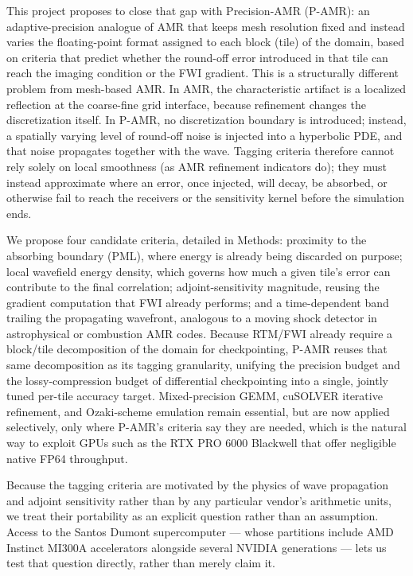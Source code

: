 \documentclass[12pt,a4paper]{article}
\newcommand{\pamr}{P\nobreakdash-AMR}
\begin{document}
This project proposes to close that gap with Precision-AMR (\pamr{}): an
adaptive-precision analogue of AMR that keeps mesh resolution fixed and instead
varies the floating-point format assigned to each block (tile) of the domain,
based on criteria that predict whether the round-off error introduced in that
tile can reach the imaging condition or the FWI gradient. This is a structurally
different problem from mesh-based AMR. In AMR, the characteristic artifact is a
localized reflection at the coarse-fine grid interface, because refinement
changes the discretization itself. In \pamr{}, no discretization boundary is
introduced; instead, a spatially varying level of round-off noise is injected
into a hyperbolic PDE, and that noise propagates together with the wave. Tagging
criteria therefore cannot rely solely on local smoothness (as AMR refinement
indicators do); they must instead approximate where an error, once injected, will
decay, be absorbed, or otherwise fail to reach the receivers or the sensitivity
kernel before the simulation ends.

We propose four candidate criteria, detailed in Methods: proximity to the
absorbing boundary (PML), where energy is already being discarded on purpose;
local wavefield energy density, which governs how much a given tile's error can
contribute to the final correlation; adjoint-sensitivity magnitude, reusing the
gradient computation that FWI already performs; and a time-dependent band
trailing the propagating wavefront, analogous to a moving shock detector in
astrophysical or combustion AMR codes. Because RTM/FWI already require a
block/tile decomposition of the domain for checkpointing, \pamr{} reuses that
same decomposition as its tagging granularity, unifying the precision budget and
the lossy-compression budget of differential checkpointing into a single, jointly
tuned per-tile accuracy target. Mixed-precision GEMM, cuSOLVER iterative
refinement, and Ozaki-scheme emulation remain essential, but are now applied
selectively, only where \pamr{}'s criteria say they are needed, which is the
natural way to exploit GPUs such as the RTX PRO 6000 Blackwell that offer
negligible native FP64 throughput.

Because the tagging criteria are motivated by the physics of wave propagation and
adjoint sensitivity rather than by any particular vendor's arithmetic units, we
treat their portability as an explicit question rather than an assumption. Access
to the Santos Dumont supercomputer --- whose partitions include AMD Instinct
MI300A accelerators alongside several NVIDIA generations --- lets us test that
question directly, rather than merely claim it.
\end{document}
